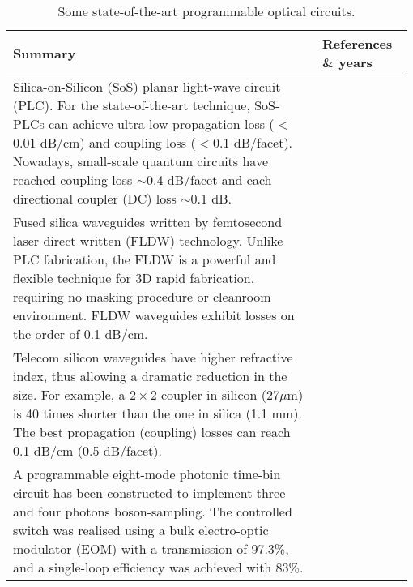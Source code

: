 \begin{table*}[!htbp]
	\begin{tabular}{|p{0.755\linewidth}|p{0.22\linewidth}|}
		\hline
	\textbf{Summary} & \textbf{References \& years} \\	\hline \hline
		Silica-on-Silicon (SoS) planar light-wave circuit (PLC). For the state-of-the-art technique, SoS-PLCs can achieve ultra-low propagation loss ($<$0.01 dB/cm) and coupling loss ($<$0.1 dB/facet). Nowadays, small-scale quantum circuits have reached coupling loss $\sim$0.4 dB/facet and each directional coupler (DC) loss $\sim$0.1 dB. &  \cite{bib:hibino2003silica, bib:carolan2015universal} \\
		\hline
		Fused silica waveguides written by femtosecond laser direct written (FLDW) technology. Unlike PLC fabrication, the FLDW is a powerful and flexible technique for 3D rapid fabrication, requiring no masking procedure or cleanroom environment. FLDW waveguides exhibit losses on the order of 0.1 dB/cm. & \cite{bib:sakuma2003ultra} \\
		\hline
		Telecom silicon waveguides have higher refractive index, thus allowing a dramatic reduction in the size. For example, a $2 \times 2$ coupler in silicon (27$\mu$m) is 40 times shorter than the one in silica (1.1 mm). The best propagation (coupling) losses can reach 0.1 dB/cm (0.5 dB/facet). &  \cite{bib:bonneau2012quantum, bib:lee2000, bib:almeida2003, bib:mcnab2003} \\
		\hline
		A programmable eight-mode photonic time-bin circuit has been constructed to implement three and four photons boson-sampling. The controlled switch was realised using a bulk electro-optic modulator (EOM) with a transmission of 97.3\%, and a single-loop efficiency was achieved with 83\%.  & \cite{bib:he2017time} \\
		\hline
	\end{tabular}
	\captionspacetab \caption{Some state-of-the-art programmable optical circuits.} \label{tab:waveguide_fibre}
\end{table*}


